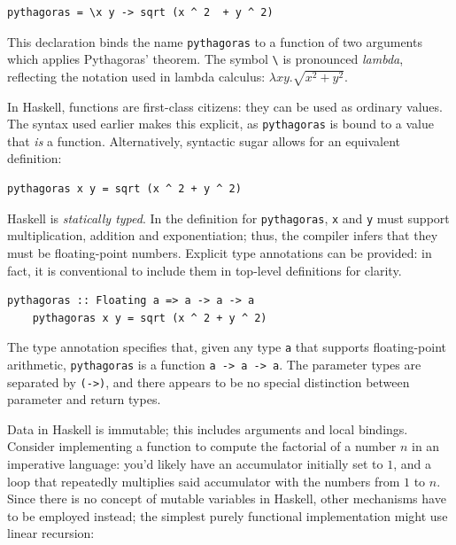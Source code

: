 \documentclass[UdineBachThesis,american,11pt]{PhdThesis}
\begin{document}
  \begin{Verbatim}[gobble=4,fontsize=\small]
    pythagoras = \x y -> sqrt (x ^ 2  + y ^ 2)
  \end{Verbatim}

  \pagebreak

  This declaration binds the name \mbox{\texttt{pythagoras}} to a function of
  two arguments which applies Pythagoras' theorem. The symbol
  \texttt{\textbackslash} is pronounced \emph{lambda}, reflecting the
  notation used in lambda calculus: \mbox{$\lambda x y . \sqrt{x^2 + y^2}$}.

  In Haskell, functions are first-class citizens: they can be used as ordinary
  values. The syntax used earlier makes this explicit, as
  \mbox{\texttt{pythagoras}} is bound to a value that \emph{is} a function.
  Alternatively, syntactic sugar allows for an equivalent definition:

  \begin{Verbatim}[gobble=4,fontsize=\small]
    pythagoras x y = sqrt (x ^ 2 + y ^ 2)
  \end{Verbatim}

  Haskell is \emph{statically typed}. In the definition for
  \mbox{\texttt{pythagoras}}, \texttt{x} and \texttt{y} must support
  multiplication, addition and exponentiation; thus, the compiler infers that
  they must be floating-point numbers. Explicit type annotations can be
  provided: in fact, it is conventional to include them in top-level definitions
  for clarity.

  \begin{Verbatim}[gobble=4,fontsize=\small]
    pythagoras :: Floating a => a -> a -> a
    pythagoras x y = sqrt (x ^ 2 + y ^ 2)
  \end{Verbatim}

  The type annotation specifies that, given any type \texttt{a} that supports
  floating-point arithmetic, \mbox{\texttt{pythagoras}} is a function
  \mbox{\texttt{a -> a -> a}}. The parameter types are separated by
  \mbox{\texttt{(->)}}, and there appears to be no special distinction between
  parameter and return types.

  Data in Haskell is immutable; this includes arguments and local bindings.
  Consider implementing a function to compute the factorial of a number $n$ in
  an imperative language: you'd likely have an accumulator initially set to $1$,
  and a loop that repeatedly multiplies said accumulator with the numbers from
  $1$ to $n$. Since there is no concept of mutable variables in Haskell, other
  mechanisms have to be employed instead; the simplest purely functional
  implementation might use linear recursion:
\end{document}

